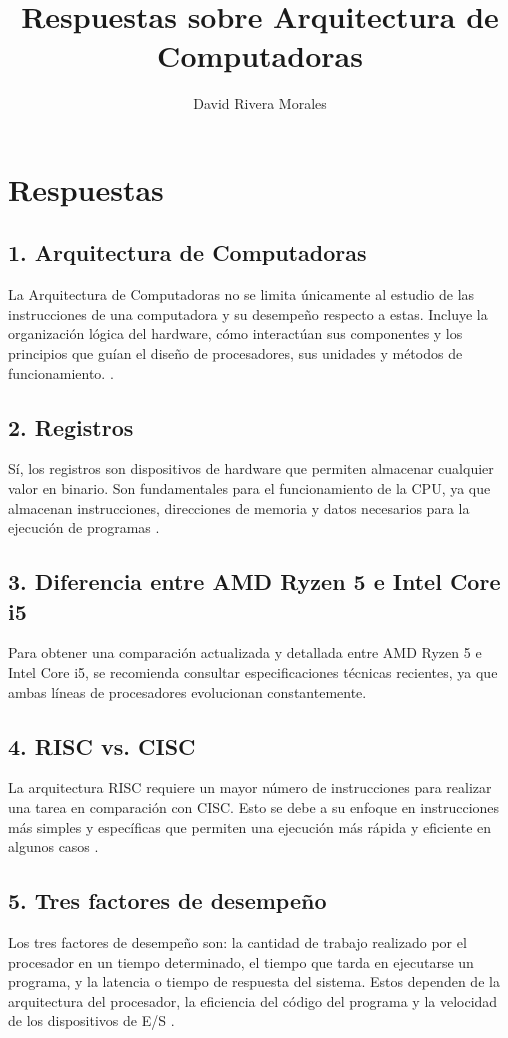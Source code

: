 \documentclass[12pt]{article}
\title{Respuestas sobre Arquitectura de Computadoras}
\author{David Rivera Morales}
\begin{document}
\maketitle

\section*{Respuestas}

\subsection*{1. Arquitectura de Computadoras}
La Arquitectura de Computadoras no se limita únicamente al estudio de las instrucciones de una computadora y su desempeño respecto a estas. Incluye la organización lógica del hardware, cómo interactúan sus componentes y los principios que guían el diseño de procesadores, sus unidades y métodos de funcionamiento. \citep{profesional_review_2022}.

\subsection*{2. Registros}
Sí, los registros son dispositivos de hardware que permiten almacenar cualquier valor en binario. Son fundamentales para el funcionamiento de la CPU, ya que almacenan instrucciones, direcciones de memoria y datos necesarios para la ejecución de programas \citep{profesional_review_2022}.

\subsection*{3. Diferencia entre AMD Ryzen 5 e Intel Core i5}
Para obtener una comparación actualizada y detallada entre AMD Ryzen 5 e Intel Core i5, se recomienda consultar especificaciones técnicas recientes, ya que ambas líneas de procesadores evolucionan constantemente.

\subsection*{4. RISC vs. CISC}
La arquitectura RISC requiere un mayor número de instrucciones para realizar una tarea en comparación con CISC. Esto se debe a su enfoque en instrucciones más simples y específicas que permiten una ejecución más rápida y eficiente en algunos casos \citep{profesional_review_risc}.

\subsection*{5. Tres factores de desempeño}
Los tres factores de desempeño son: la cantidad de trabajo realizado por el procesador en un tiempo determinado, el tiempo que tarda en ejecutarse un programa, y la latencia o tiempo de respuesta del sistema. Estos dependen de la arquitectura del procesador, la eficiencia del código del programa y la velocidad de los dispositivos de E/S \citep{profesional_review_2022}.
\end{document}
